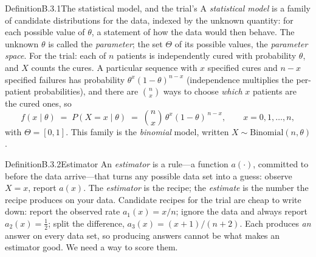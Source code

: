 \documentclass[main.tex]{subfiles}
\begin{document}
\begin{Obj}{Definition}{B.3.1}{The statistical model, and the trial's}
A \emph{statistical model} is a family of candidate distributions for the data, indexed by
the unknown quantity: for each possible value of $\theta$, a statement of how the data would
then behave. The unknown $\theta$ is called the \emph{parameter}; the set $\Theta$ of its
possible values, the \emph{parameter space}. For the trial: each of $n$ patients is
independently cured with probability $\theta$, and $X$ counts the cures. A particular
sequence with $x$ specified cures and $n-x$ specified failures has probability
$\theta^x(1-\theta)^{n-x}$ (independence multiplies the per-patient probabilities), and
there are $\binom{n}{x}$ ways to choose \emph{which} $x$ patients are the cured ones, so
\[ f(x \mid \theta) \;=\; P(X = x \mid \theta)
   \;=\; \binom{n}{x}\,\theta^{x}(1-\theta)^{\,n-x} ,
   \qquad x = 0, 1, \dots, n , \]
with $\Theta=[0,1]$. This family is the \emph{binomial} model, written
$X\sim\text{Binomial}(n,\theta)$.
\end{Obj}

\begin{Obj}{Definition}{B.3.2}{Estimator}
An \emph{estimator} is a rule---a function $a(\cdot)$, committed to before the data
arrive---that turns any possible data set into a guess: observe $X=x$, report $a(x)$. The
\emph{estimator} is the recipe; the \emph{estimate} is the number the recipe produces on your
data. Candidate recipes for the trial are cheap to write down: report the observed rate
$a_1(x)=x/n$; ignore the data and always report $a_2(x)=\tfrac12$; split the difference,
$a_3(x)=(x+1)/(n+2)$. Each produces \emph{an} answer on every data set, so producing answers
cannot be what makes an estimator good. We need a way to score them.
\end{Obj}
\end{document}
